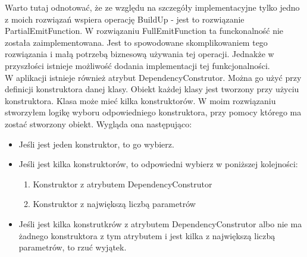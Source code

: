 \documentclass[12pt]{article}
\begin{document}
Warto tutaj odnotować, że ze względu na szczegóły implementacyjne tylko jedno z moich rozwiązań wspiera operację BuildUp - jest to rozwiązanie PartialEmitFunction. W rozwiązaniu FullEmitFunction ta funckonalność nie została zaimplementowana. Jest to spowodowane skomplikowaniem tego rozwiązania i małą potrzebą biznesową używania tej operacji. Jednakże w przyszłości istnieje możliwość dodania implementacji tej funkcjonalności.\\

W aplikacji istnieje również atrybut DependencyConstrutor. Można go użyć przy definicji konstruktora danej klasy. Obiekt każdej klasy jest tworzony przy użyciu konstruktora. Klasa może mieć kilka konstruktorów. W moim rozwiązaniu stworzyłem logikę wyboru odpowiedniego konstruktora, przy pomocy którego ma zostać stworzony obiekt. Wygląda ona następująco:
\begin{itemize}
	\item Jeśli jest jeden konstruktor, to go wybierz.
	\item Jeśli jest kilka konstruktorów, to odpowiedni wybierz w poniższej kolejności:
	\begin{enumerate}
		\item Konstruktor z atrybutem DependencyConstrutor
		\item Konstruktor z największą liczbą parametrów
	\end{enumerate}
	\item Jeśli jest kilka konstrutkrów z atrybutem DependencyConstrutor albo nie ma żadnego konstruktora z tym atrybutem i jest kilka z największą liczbą parametrów, to rzuć wyjątek.
\end{itemize}
\end{document}
